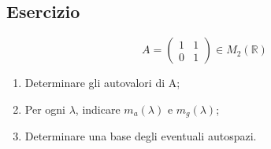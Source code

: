 \subsection{Esercizio}
\label{sec:esAutovettori}

\begin{equation}
  \label{eq:esAuto}
  A=
  \begin{pmatrix}
    1 & 1\\
    0 & 1 
  \end{pmatrix} \in M_2 (\mathds{R})
\end{equation}
\begin{enumerate}
\item Determinare gli autovalori di A;
\item Per ogni $\lambda$, indicare $m_a(\lambda)$ e $m_g(\lambda)$;
\item Determinare una base degli eventuali autospazi.
\end{enumerate}

